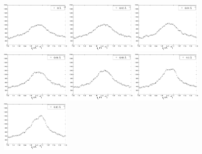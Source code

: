 \begin{figure}[htbp]
  \centering
  \includegraphics[width=0.3\textwidth]{figures/ripple/TWAXS/twaxs_qrplot2}
  \includegraphics[width=0.3\textwidth]{figures/ripple/TWAXS/twaxs_qrplot3}
  \includegraphics[width=0.3\textwidth]{figures/ripple/TWAXS/twaxs_qrplot4}
  \includegraphics[width=0.3\textwidth]{figures/ripple/TWAXS/twaxs_qrplot5}
  \includegraphics[width=0.3\textwidth]{figures/ripple/TWAXS/twaxs_qrplot6}
  \includegraphics[width=0.3\textwidth]{figures/ripple/TWAXS/twaxs_qrplot7}
  \includegraphics[width=0.3\textwidth]{figures/ripple/TWAXS/twaxs_qrplot8}

\end{figure}
